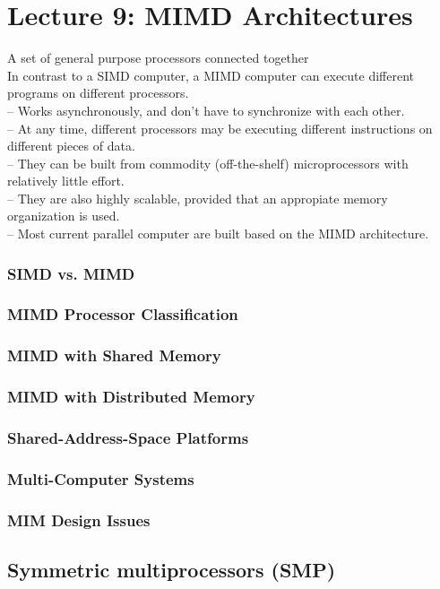 \section{Lecture 9: MIMD Architectures}
A set of general purpose processors connected together \\
In contrast to a SIMD computer, a MIMD computer can execute different programs on different processors. \\

-- Works asynchronously, and don't have to synchronize with each other. \\
-- At any time, different processors may be executing different instructions on different pieces of data. \\
-- They can be built from commodity (off-the-shelf) microprocessors with relatively little effort. \\
-- They are also highly scalable, provided that an appropiate memory organization is used. \\
-- Most current parallel computer are built based on the MIMD architecture. \\

\subsubsection{SIMD vs. MIMD}
\subsubsection{MIMD Processor Classification}
\subsubsection{MIMD with Shared Memory}
\subsubsection{MIMD with Distributed Memory}
\subsubsection{Shared-Address-Space Platforms}
\subsubsection{Multi-Computer Systems}
\subsubsection{MIM Design Issues}
\subsection{Symmetric multiprocessors (SMP)}
